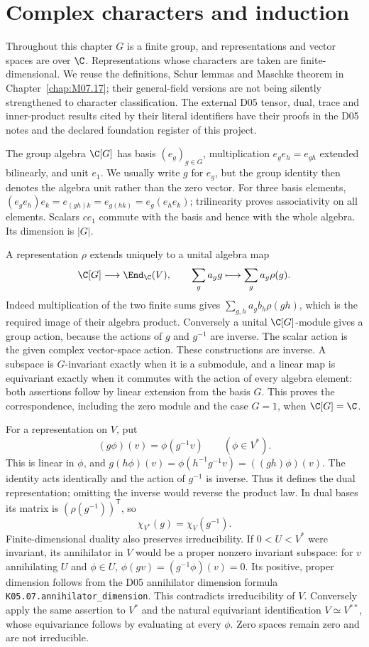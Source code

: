 \chapter{Complex characters and induction}\label{chap:M07.21}
Throughout this chapter $G$ is a finite group, and representations and
vector spaces are over $\C$. Representations whose characters are taken
are finite-dimensional. We reuse the definitions, Schur lemmas and
Maschke theorem in Chapter~\ref{chap:M07.17}; their general-field versions
are not being silently strengthened to character classification.
The external D05 tensor, dual, trace and inner-product results cited by
their literal identifiers have their proofs in the D05 notes and the
declared foundation register of this project.

The group algebra $\C[G]$ has basis $(e_g)_{g\in G}$, multiplication
$e_ge_h=e_{gh}$ extended bilinearly, and unit $e_1$.
We usually write $g$ for $e_g$, but the group identity then denotes
the algebra unit rather than the zero vector. For three basis elements,
$(e_ge_h)e_k=e_{(gh)k}=e_{g(hk)}=e_g(e_he_k)$; trilinearity
proves associativity on all elements. Scalars $ce_1$ commute with the
basis and hence with the whole algebra. Its dimension is $|G|$.

A representation $\rho$ extends uniquely to a unital algebra map
\[
 \C[G]\longrightarrow\End_\C(V),\qquad
 \sum_g a_g g\longmapsto\sum_g a_g\rho(g).
\]
Indeed multiplication of the two finite sums gives
$\sum_{g,h}a_gb_h\rho(gh)$, which is the required image of their
algebra product. Conversely a unital $\C[G]$-module gives a group
action, because the actions of $g$ and $g^{-1}$ are inverse. The
scalar action is the given complex vector-space action. These
constructions are inverse. A subspace is $G$-invariant exactly when it
is a submodule, and a linear map is equivariant exactly when it commutes
with the action of every algebra element: both assertions follow by
linear extension from the basis $G$. This proves the correspondence,
including the zero module and the case $G=1$, when $\C[G]=\C$.

For a representation on $V$, put
\[
 (g\phi)(v)=\phi(g^{-1}v)\qquad(\phi\in V^*).
\]
This is linear in $\phi$, and
$g(h\phi)(v)=\phi(h^{-1}g^{-1}v)=((gh)\phi)(v)$.
The identity acts identically and the action of $g^{-1}$ is inverse.
Thus it defines the dual representation; omitting the inverse would
reverse the product law. In dual bases its matrix is
$(\rho(g^{-1}))^{\mathsf T}$, so
\[
 \chi_{V^*}(g)=\chi_V(g^{-1}).
\]
Finite-dimensional duality also preserves irreducibility. If
$0<U<V^*$ were invariant, its annihilator in $V$ would be a proper
nonzero invariant subspace: for $v$ annihilating $U$ and $\phi\in U$,
$\phi(gv)=(g^{-1}\phi)(v)=0$. Its positive, proper dimension follows
from the D05 annihilator dimension formula
\texttt{K05.07.annihilator\_dimension}. This contradicts irreducibility
of $V$. Conversely apply the same assertion to $V^*$ and the natural
equivariant identification $V\simeq V^{**}$, whose equivariance follows
by evaluating at every $\phi$. Zero spaces remain zero and are not
irreducible.

